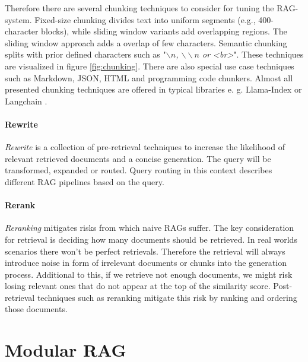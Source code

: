 Therefore there are several chunking techniques to consider for tuning the RAG-system. Fixed-size chunking divides text into uniform segments (e.g., 400-character blocks), while sliding window variants add overlapping regions. The sliding window approach adds a overlap of few characters. Semantic chunking splits with prior defined characters such as "\textit{$\backslash n$, $\backslash\backslash n$ or <br>}". These techniques are visualized in figure \ref{fig:chunking}. There are also special use case techniques such as Markdown, JSON, HTML and programming code chunkers. Almost all presented chunking techniques are offered in typical libraries e. g. Llama-Index \cite{Liu_LlamaIndex_2022} or Langchain \cite{Chase_LangChain_2022}.


\paragraph{Rewrite}
\label{sec:rewrite}
\textit{Rewrite} is a collection of pre-retrieval techniques to increase the likelihood of relevant retrieved documents and a concise generation. The query will be transformed, expanded or routed. Query routing in this context describes different RAG pipelines based on the query.\cite{Gao.18.12.2023}

\paragraph{Rerank}
\label{sec:rerank}
\textit{Reranking} mitigates risks from which naive RAGs suffer. The key consideration for retrieval is deciding how many documents should be retrieved. In real worlds scenarios there won't be perfect retrievals. Therefore the retrieval will always introduce noise in form of irrelevant documents or chunks into the generation process. Additional to this, if we retrieve not enough documents, we might risk losing relevant ones that do not appear at the top of the similarity score. Post-retrieval techniques such as reranking mitigate this risk by ranking and ordering those documents.\cite{Gao.18.12.2023}


\section{Modular RAG}

